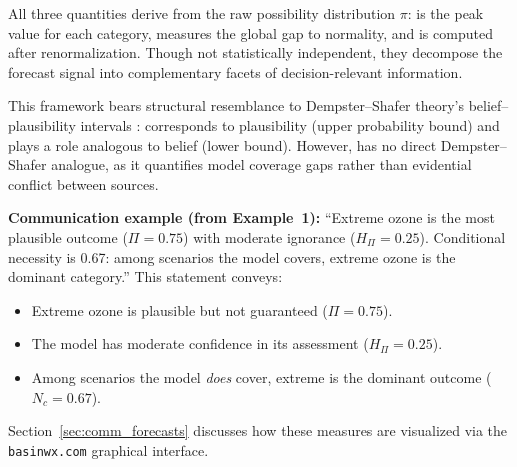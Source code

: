 All three quantities derive from the raw possibility distribution $\pi$: \poss{} is the peak value for each category, \ign{} measures the global gap to normality, and \Nc{} is computed after renormalization. Though not statistically independent, they decompose the forecast signal into complementary facets of decision-relevant information.

This framework bears structural resemblance to Dempster--Shafer theory's belief--plausibility intervals \citep{Shafer1976-MISSING}: \poss{} corresponds to plausibility (upper probability bound) and \Nc{} plays a role analogous to belief (lower bound). However, \ign{} has no direct Dempster--Shafer analogue, as it quantifies model coverage gaps rather than evidential conflict between sources.

\textbf{Communication example (from Example~1):} ``Extreme ozone is the most plausible outcome ($\Pi = 0.75$) with moderate ignorance ($H_\Pi = 0.25$). Conditional necessity is 0.67: among scenarios the model covers, extreme ozone is the dominant category.'' This statement conveys:
\begin{itemize}[leftmargin=2em]
\item Extreme ozone is plausible but not guaranteed ($\Pi=0.75$).
\item The model has moderate confidence in its assessment ($H_\Pi=0.25$).
\item Among scenarios the model \textit{does} cover, extreme is the dominant outcome ($N_c=0.67$).
\end{itemize}

Section~\ref{sec:comm_forecasts} discusses how these measures are visualized via the \texttt{basinwx.com} graphical interface.

